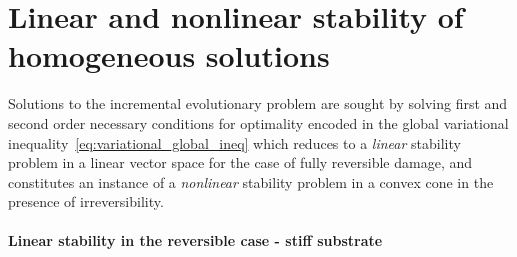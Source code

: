 \documentclass[10pt]{article}
\begin{document}
\section{Linear and nonlinear stability {of homogeneous solutions}}
\label{sec:stability}

Solutions to the incremental evolutionary problem are sought by solving first and second order necessary conditions for optimality encoded in the global variational inequality~\eqref{eq:variational_global_ineq} which reduces to a \emph{linear} stability problem in a linear vector space for the case of fully reversible damage, and constitutes an instance of a \emph{nonlinear} stability problem in a convex cone in the presence of irreversibility.

\paragraph{Linear stability in the reversible case - stiff substrate}
\end{document}
